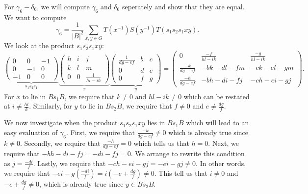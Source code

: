 \documentclass[11pt]{amsart}
\theoremstyle{remark}
\begin{document}
For $\gamma_6-\delta_6$, we will compute $\gamma_6$ and $\delta_6$ seperately and show that they are equal.
We want to compute
\[
	\gamma_6 = \frac{1}{|B|^2}\sum_{x,y\in G} T(x^{-1})S(y^{-1})T(s_1s_2s_1xy).
\]
We look at the product $s_1s_2s_1xy$:
\[
	\underbrace{\begin{pmatrix}
			0  & 0  & -1 \\
			0  & -1 & 0  \\
			-1 & 0  & 0
		\end{pmatrix}}_{s_1s_2s_1}
	\underbrace{\begin{pmatrix}
			h & i & j               \\
			k & l & m               \\
			0 & 0 & \frac{1}{hl-ik}
		\end{pmatrix}}_{x}
	\underbrace{\begin{pmatrix}
			\frac{1}{dg-ef} & b & c \\
			0               & d & e \\
			0               & f & g
		\end{pmatrix}}_{y} =
	\begin{pmatrix}
		0                & \frac{-f}{hl-ik} & \frac{-g}{hl-ik} \\
		\frac{-k}{dg-ef} & -bk-dl-fm        & -ck-el-gm        \\
		\frac{-h}{dg-ef} & -bh-di-fj        & -ch-ei-gj
	\end{pmatrix}.
\]
For $x$ to lie in $Bs_1B$, we require that $k\neq 0$ and $hl-ik\neq 0$ which can be restated at $i\neq \frac{hl}{k}$.
Similarly, for $y$ to lie in $Bs_2B$, we require that $f\neq 0$ and $e\neq\frac{dg}{f}$.

We now investigate when the product $s_1s_2s_1xy$ lies in $Bs_1B$ which will lead to an easy evaluation of $\gamma_6$.
First, we require that $\frac{-k}{dg-ef}\neq 0$ which is already true since $k\neq 0$.
Secondly, we require that $\frac{-h}{dg-ef}=0$ which tells us that $h=0$.
Next, we require that $-bh-di-fj=-di-fj=0$.
We arrange to rewrite this condition as $j=\frac{-di}{f}$.
Lastly, we require that $-ch-ei-gj=-ei-gj\neq 0$.
In other words, we require that $-ei-g(\frac{-di}{f})=i(-e+\frac{dg}{f})\neq 0$.
This tell us that $i\neq 0$ and $-e+\frac{dg}{f}\neq 0$, which is already true since $y\in Bs_2B$.
\end{document}
